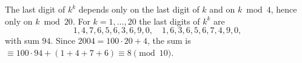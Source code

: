 The last digit of $k^k$ depends only on the last digit of $k$ and on $k\bmod4$, hence only on $k\bmod20$. For $k=1,\dots,20$ the last digits of $k^k$ are
\[1,4,7,6,5,6,3,6,9,0,\quad1,6,3,6,5,6,7,4,9,0,\]
with sum $94$. Since $2004=100\cdot20+4$, the sum is $\equiv100\cdot94+(1+4+7+6)\equiv\boxed{8}\pmod{10}$.
